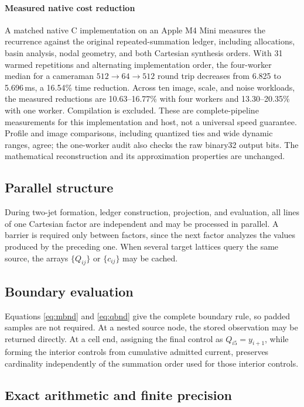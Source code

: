 \documentclass[journal]{IEEEtran}
\begin{document}
\paragraph{Measured native cost reduction}
A matched native C implementation on an Apple M4 Mini measures the recurrence
against the original repeated-summation ledger, including allocations, basin
analysis, nodal geometry, and both Cartesian synthesis orders. With 31 warmed
repetitions and alternating implementation order, the four-worker median for
a cameraman \(512\to64\to512\) round trip decreases from 6.825 to
5.696\,ms, a 16.54\% time reduction. Across ten image, scale, and noise
workloads, the measured reductions are 10.63--16.77\% with four workers
and 13.30--20.35\% with one worker. Compilation is excluded. These are
complete-pipeline measurements for this implementation and host, not a
universal speed guarantee. Profile and image comparisons, including
quantized ties and wide dynamic ranges, agree; the one-worker audit also
checks the raw binary32 output bits. The mathematical reconstruction and
its approximation properties are unchanged.

\subsection{Parallel structure}

During two-jet formation, ledger construction, projection, and evaluation,
all lines of one Cartesian factor are independent and may be processed in
parallel. A barrier is required only between factors, since the next factor
analyzes the values produced by the preceding one. When several target
lattices query the same source, the arrays \(\{Q_{ij}\}\) or
\(\{c_{ij}\}\) may be cached.

\subsection{Boundary evaluation}

Equations \eqref{eq:mbnd} and \eqref{eq:qbnd} give the complete boundary
rule, so padded samples are not required. At a nested source node, the stored
observation may be returned directly. At a cell end, assigning the final
control as \(Q_{i5}=y_{i+1}\), while forming the interior controls from
cumulative admitted current, preserves cardinality independently of the
summation order used for those interior controls.

\subsection{Exact arithmetic and finite precision}
\end{document}

